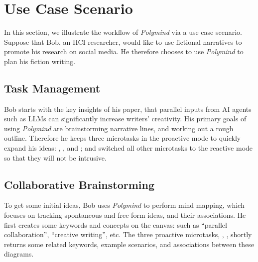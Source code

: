 

  
\section{Use Case Scenario}
In this section, we illustrate the workflow of \textit{Polymind} via a use case scenario. Suppose that Bob, an HCI researcher, would like to use fictional narratives to promote his research on social media. He therefore chooses to use \textit{Polymind} to plan his fiction writing.

\subsection*{Task Management}
Bob starts with the key insights of his paper, that parallel inputs from AI agents such as LLMs can significantly increase writers' creativity. His primary goals of using \textit{Polymind} are brainstorming narrative lines, and working out a rough outline. Therefore he keeps three microtasks in the proactive mode to quickly expand his ideas: \BboxS{\textcolor{white}{Brainstorm}}, \EboxS{\textcolor{white}{Elaborate}}, and \AboxS{\textcolor{white}{Associate}}; and switched all other microtasks to the reactive mode so that they will not be intrusive.

\subsection*{Collaborative Brainstorming}
To get some initial ideas, Bob uses \textit{Polymind} to perform mind mapping, which focuses on tracking spontaneous and free-form ideas, and their associations.
He first creates some keywords and concepts on the canvas: such as ``parallel collaboration'', ``creative writing'', etc. The three proactive microtasks, \BboxS{\textcolor{white}{Brainstorm}}, \EboxS{\textcolor{white}{Elaborate}}, \AboxS{\textcolor{white}{Associate}} shortly returns some related keywords, example scenarios, and associations between these diagrams.

